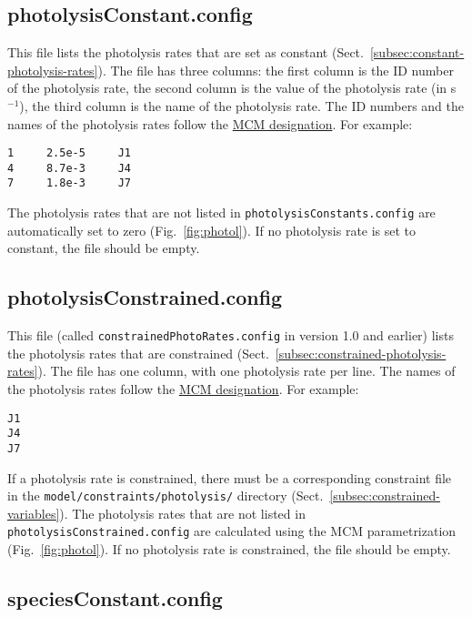 \subsection{photolysisConstant.config} \label{subsec:photolysisconstant}

This file lists the photolysis rates that are set as constant
(Sect.~\ref{subsec:constant-photolysis-rates}). The file has three
columns: the first column is the ID number of the photolysis rate, the
second column is the value of the photolysis rate (in s$^{-1}$), the
third column is the name of the photolysis rate. The ID numbers and
the names of the photolysis rates follow the
\href{https://mcm.york.ac.uk/MCM/rates/photolysis}{MCM designation}.
For example:

\begin{verbatim}
1     2.5e-5     J1
4     8.7e-3     J4
7     1.8e-3     J7
\end{verbatim}

The photolysis rates that are not listed in \texttt{photolysisConstants.config}
are automatically set to zero (Fig.~\ref{fig:photol}). If no photolysis rate
is set to constant, the file should be empty.

\subsection{photolysisConstrained.config} \label{subsec:photolysisconstrained}

This file (called \texttt{constrainedPhotoRates.config} in version 1.0
and earlier) lists the photolysis rates that are constrained
(Sect.~\ref{subsec:constrained-photolysis-rates}). The file has one column,
with one photolysis rate per line. The names of the photolysis rates follow
the \href{https://mcm.york.ac.uk/MCM/rates/photolysis}{MCM designation}.
For example:

\begin{verbatim}
J1
J4
J7
\end{verbatim}

If a photolysis rate is constrained, there must be a corresponding
constraint file in the \texttt{model/constraints/photolysis/}
directory (Sect.~\ref{subsec:constrained-variables}). The photolysis
rates that are not listed in \texttt{photolysisConstrained.config} are
calculated using the MCM parametrization (Fig.~\ref{fig:photol}). If
no photolysis rate is constrained, the file should be empty.

\subsection{speciesConstant.config} \label{subsec:speciesconstant}

